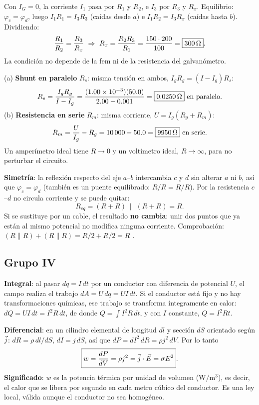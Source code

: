 Con $I_G=0$, la corriente $I_1$ pasa por $R_1$ y $R_2$, e $I_3$ por $R_3$ y $R_x$. Equilibrio: $\varphi_c=\varphi_d$, luego $I_1R_1=I_3R_3$ (caídas desde $a$) e $I_1R_2=I_3R_x$ (caídas hasta $b$). Dividiendo:
\[
\frac{R_1}{R_2}=\frac{R_3}{R_x}\ \Rightarrow\ R_x=\frac{R_2R_3}{R_1}=\frac{150\cdot200}{100}=\boxed{300\ohm}.
\]
La condición no depende de la fem ni de la resistencia del galvanómetro.

(a) \textbf{Shunt en paralelo} $R_s$: misma tensión en ambos, $I_gR_g=(I-I_g)R_s$:
\[
R_s=\frac{I_gR_g}{I-I_g}=\frac{(1.00\times10^{-3})(50.0)}{2.00-0.001}=\boxed{0.0250\ohm}\ \text{en paralelo}.
\]
(b) \textbf{Resistencia en serie} $R_m$: misma corriente, $U=I_g(R_g+R_m)$:
\[
R_m=\frac{U}{I_g}-R_g=10\,000-50.0=\boxed{9950\ohm}\ \text{en serie}.
\]
Un amperímetro ideal tiene $R\to0$ y un voltímetro ideal, $R\to\infty$, para no perturbar el circuito.

\begin{center}\end{center}
\textbf{Simetría}: la reflexión respecto del eje $a$--$b$ intercambia $c$ y $d$ sin alterar $a$ ni $b$, así que $\varphi_c=\varphi_d$ (también es un puente equilibrado: $R/R=R/R$). Por la resistencia $c$--$d$ no circula corriente y se puede quitar:
\[
R_{eq}=(R+R)\,\|\,(R+R)=\boxed{R}.
\]
Si se sustituye por un cable, el resultado \textbf{no cambia}: unir dos puntos que ya están al mismo potencial no modifica ninguna corriente. Comprobación: $(R\|R)+(R\|R)=R/2+R/2=R$ \checkmark.

\subsection*{Grupo IV}
\textbf{Integral}: al pasar $dq=I\,dt$ por un conductor con diferencia de potencial $U$, el campo realiza el trabajo $dA=U\,dq=UI\,dt$. Si el conductor está fijo y no hay transformaciones químicas, ese trabajo se transforma íntegramente en calor: $dQ=UI\,dt=I^2R\,dt$, de donde $Q=\int I^2R\,dt$, y con $I$ constante, $Q=I^2Rt$.

\textbf{Diferencial}: en un cilindro elemental de longitud $dl$ y sección $dS$ orientado según $\vec{j}$: $dR=\rho\,dl/dS$, $dI=j\,dS$, así que $dP=dI^2\,dR=\rho j^2\,dV$. Por lo tanto
\[
\boxed{w=\frac{dP}{dV}=\rho j^2=\vec{j}\cdot\vec{E}=\sigma E^2}.
\]
\textbf{Significado}: $w$ es la potencia térmica por unidad de volumen ($\mathrm{W/m^3}$), es decir, el calor que se libera por segundo en cada metro cúbico del conductor. Es una ley local, válida aunque el conductor no sea homogéneo.

